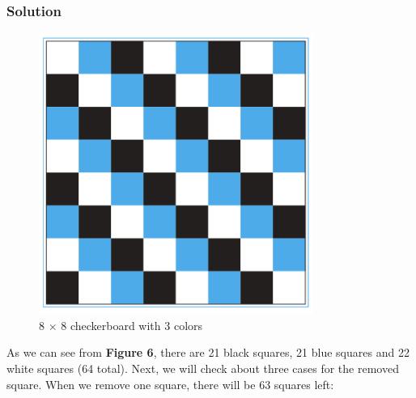 \documentclass{article}
\begin{document}
\subsubsection*{Solution}
\begin{figure}
    \begin{center}
        \includegraphics[width = 0.8\textwidth]{8x8Checkerboard3Color.png}
        \caption{8 \(\times\) 8 checkerboard with 3 colors}
    \end{center}
\end{figure}
As we can see from \textbf{Figure 6}, there are 21 black squares, 21 blue squares
and 22 white squares (64 total). Next, we will check about three cases for the
removed square. When we remove one square, there will be 63 squares left:
\end{document}
